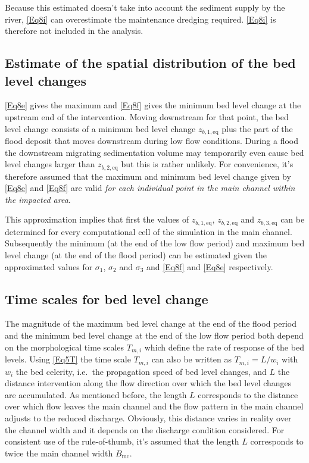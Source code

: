 Because this estimated doesn't take into account the sediment supply by the river, \autoref{Eq8i} can overestimate the maintenance dredging required.
\autoref{Eq8i} is therefore not included in the \dfastmi analysis.

\subsection{Estimate of the spatial distribution of the bed level changes}

\autoref{Eq8e} gives the maximum and \autoref{Eq8f} gives the minimum bed level change at the upstream end of the intervention.
Moving downstream for that point, the bed level change consists of a minimum bed level change $z_{b,1,\text{eq}}$ plus the part of the flood deposit that moves downstream during low flow conditions.
During a flood the downstream migrating sedimentation volume may temporarily even cause bed level changes larger than $z_{b,2,\text{eq}}$ but this is rather unlikely.
For convenience, it's therefore assumed that the maximum and minimum bed level change given by \autoref{Eq8e} and \autoref{Eq8f} are valid \emph{for each individual point in the main channel within the impacted area}.

This approximation implies that first the values of $z_{b,1,\text{eq}}$, $z_{b,2,\text{eq}}$ and $z_{b,3,\text{eq}}$ can be determined for every computational cell of the simulation in the main channel.
Subsequently the minimum (at the end of the low flow period) and maximum bed level change (at the end of the flood period) can be estimated given the approximated values for $\sigma_1$, $\sigma_2$ and $\sigma_3$ and \autoref{Eq8f} and \autoref{Eq8e} respectively.

\subsection{Time scales for bed level change}

The magnitude of the maximum bed level change at the end of the flood period and the minimum bed level change at the end of the low flow period both depend on the morphological time scales $T_{m,i}$  which define the rate of response of the bed levels.
Using \autoref{Eq5T} the time scale $T_{m,i}$ can also be written as $T_{m,i} = L/w_i$ with $w_i$ the bed celerity, i.e.~the propagation speed of bed level changes, and $L$ the distance intervention along the flow direction over which the bed level changes are accumulated.
As mentioned before, the length $L$ corresponds to the distance over which flow leaves the main channel and the flow pattern in the main channel adjusts to the reduced discharge.
Obviously, this distance varies in reality over the channel width and it depends on the discharge condition considered.
For consistent use of the rule-of-thumb, it's assumed that the length $L$ corresponds to twice the main channel width $B_\text{mc}$.

